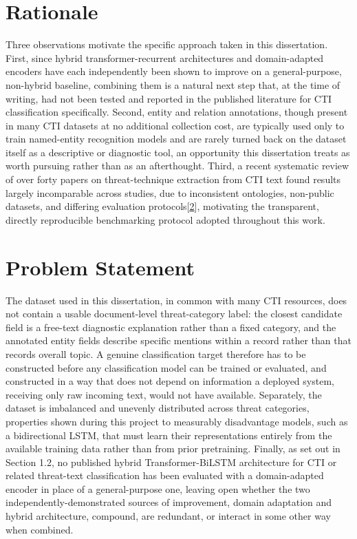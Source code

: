 \documentclass[12pt,a4paper]{report}
\begin{document}
\protect{}\label{_Toc239502924}{}\section{Rationale}

Three observations motivate the specific approach taken in this
dissertation. First, since hybrid transformer-recurrent architectures
and domain-adapted encoders have each independently been shown to
improve on a general-purpose, non-hybrid baseline, combining them is a
natural next step that, at the time of writing, had not been tested and
reported in the published literature for CTI classification
specifically. Second, entity and relation annotations, though present in
many CTI datasets at no additional collection cost, are typically used
only to train named-entity recognition models and are rarely turned back
on the dataset itself as a descriptive or diagnostic tool, an
opportunity this dissertation treats as worth pursuing rather than as an
afterthought. Third, a recent systematic review of over forty papers on
threat-technique extraction from CTI text found results largely
incomparable across studies, due to inconsistent ontologies, non-public
datasets, and differing evaluation
protocols{[}\href{file:///D:/Downloads/final-report-formatted-v4(1).docx\#ref_2}{\ul{2}}{]},
motivating the transparent, directly reproducible benchmarking protocol
adopted throughout this work.

\protect{}\label{_Toc239502925}{}\section{Problem
Statement}

The dataset used in this dissertation, in common with many CTI
resources, does not contain a usable document-level threat-category
label: the closest candidate field is a free-text diagnostic explanation
rather than a fixed category, and the annotated entity fields describe
specific mentions within a record rather than that
record\textquotesingle s overall topic. A genuine classification target
therefore has to be constructed before any classification model can be
trained or evaluated, and constructed in a way that does not depend on
information a deployed system, receiving only raw incoming text, would
not have available. Separately, the dataset is imbalanced and unevenly
distributed across threat categories, properties shown during this
project to measurably disadvantage models, such as a bidirectional LSTM,
that must learn their representations entirely from the available
training data rather than from prior pretraining. Finally, as set out in
Section 1.2, no published hybrid Transformer-BiLSTM architecture for CTI
or related threat-text classification has been evaluated with a
domain-adapted encoder in place of a general-purpose one, leaving open
whether the two independently-demonstrated sources of improvement,
domain adaptation and hybrid architecture, compound, are redundant, or
interact in some other way when combined.
\end{document}
